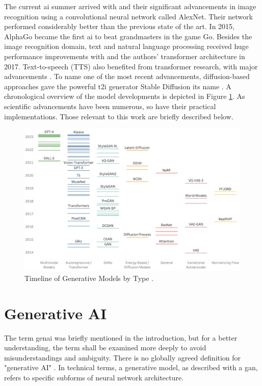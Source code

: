 \documentclass[
  a4paper,  %
  twoside,  %
  bibliography=totoc,
  headsepline,
  cleardoublepage=empty,
  parskip=half,
  draft=false
]{scrbook}
\begin{document}
The current \gls{ai} summer arrived with \citet{krizhevskyImageNetClassificationDeep2012} and their significant advancements in image recognition using a convolutional neural network called AlexNet. Their network performed considerably better than the previous state of the art. In 2015, AlphaGo became the first \gls{ai} to beat grandmasters in the game Go. Besides the image recognition domain, text and natural language processing received huge performance improvements with  and the authors' transformer architecture in 2017. Text-to-speech (TTS) also benefited from transformer research, with major advancements \cite{wangTacotronEndtoEndSpeech2017}. To name one of the most recent advancements, diffusion-based approaches gave the powerful \gls{t2i} generator Stable Diffusion its name \cite{rombachHighResolutionImageSynthesis2022}. A chronological overview of the model developments is depicted in Figure \ref{fig:timeline-models}. As scientific advancements have been numerous, so have their practical implementations. Those relevant to this work are briefly described below.

\begin{figure}[h]
  \centering
  \includegraphics[width=1\textwidth]{./graphics/Timeline_of_generative_models_by_type.png}
  \caption{Timeline of Generative Models by Type \citet{garcia_penalvo_2023_8165255}.}
  \label{fig:timeline-models}
\end{figure}

\section{Generative AI}
\label{sec:genai}
The term \gls{genai} was briefly mentioned in the introduction, but for a better understanding, the term shall be examined more deeply to avoid misunderstandings and ambiguity. There is no globally agreed definition for "generative AI" \cite{garcia-penalvoWhatWeMean2023}. In technical terms, a generative model, as described with a \gls{gan}, refers to specific subforms of neural network architecture.
\end{document}
